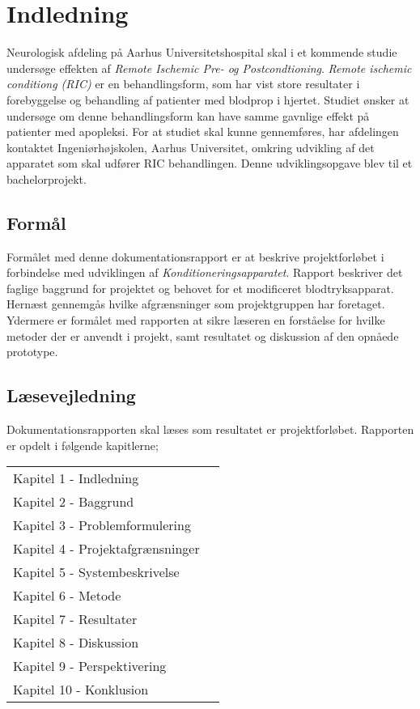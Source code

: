 \chapter{Indledning}
Neurologisk afdeling på Aarhus Universitetshospital skal i et kommende studie undersøge effekten af \textit{Remote Ischemic Pre- og Postcondtioning}. \textit{Remote ischemic conditiong (RIC)} er en behandlingsform, som har vist store resultater i forebyggelse og behandling af patienter med blodprop i hjertet. Studiet ønsker at undersøge om denne behandlingsform kan have samme gavnlige effekt på patienter med apopleksi. For at studiet skal kunne gennemføres, har afdelingen kontaktet Ingeniørhøjskolen, Aarhus Universitet, omkring udvikling af det apparatet som skal udfører RIC behandlingen. Denne udviklingsopgave blev til et bachelorprojekt. 

\section{Formål}
Formålet med denne dokumentationsrapport er at beskrive projektforløbet i forbindelse med udviklingen af \textit{Konditioneringsapparatet}. Rapport beskriver det faglige baggrund for projektet og behovet for et modificeret blodtryksapparat. Hernæst gennemgås hvilke afgrænsninger som projektgruppen har foretaget. Ydermere er formålet med rapporten at sikre læseren en forståelse for hvilke metoder der er anvendt i projekt, samt resultatet og diskussion af den opnåede prototype. 

\section{Læsevejledning}
Dokumentationsrapporten skal læses som resultatet er projektforløbet. Rapporten er opdelt i følgende kapitlerne;
	\begin{longtable}{ p{} p{} } 
		Kapitel 1 - Indledning &   \\
		Kapitel 2 - Baggrund& \\
		Kapitel 3 - Problemformulering& \\
		Kapitel 4 - Projektafgrænsninger& \\
		Kapitel 5 - Systembeskrivelse & \\
		Kapitel 6 - Metode& \\
		Kapitel 7 - Resultater& \\
		Kapitel 8 - Diskussion& \\
		Kapitel 9 - Perspektivering& \\
		Kapitel 10 - Konklusion& \\
		

	\end{longtable}

